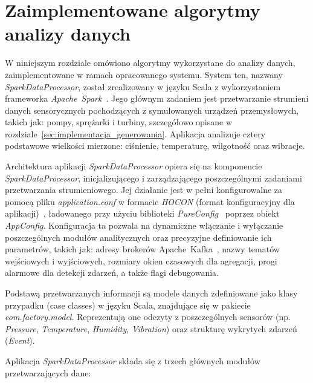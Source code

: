 \section{Zaimplementowane algorytmy analizy danych}
\label{sec:algorytmy_analizy}

W niniejszym rozdziale omówiono algorytmy wykorzystane do analizy danych, zaimplementowane w ramach opracowanego systemu. System ten, nazwany \textit{SparkDataProcessor}, został zrealizowany w języku Scala z wykorzystaniem frameworka \mbox{\textit{Apache Spark}}~\cite{spark_streaming}. Jego głównym zadaniem jest przetwarzanie strumieni danych sensorycznych pochodzących z symulowanych urządzeń przemysłowych, takich jak: pompy, sprężarki i turbiny, szczegółowo opisane w rozdziale~\ref{sec:implementacja_generowania}. Aplikacja analizuje cztery podstawowe wielkości mierzone: ciśnienie, temperaturę, wilgotność oraz wibracje.

Architektura aplikacji \textit{SparkDataProcessor} opiera się na komponencie \textit{SparkDataProcessor}, inicjalizującego i zarządzającego poszczególnymi zadaniami przetwarzania strumieniowego. Jej działanie jest w pełni konfigurowalne za pomocą pliku \textit{application.conf} w formacie \textit{HOCON} (format konfiguracyjny dla aplikacji)~\cite{hocon_spec}, ładowanego przy użyciu biblioteki \textit{PureConfig}~\cite{pureconfig_docs} poprzez obiekt \textit{AppConfig}. Konfiguracja ta pozwala na dynamiczne włączanie i wyłączanie poszczególnych modułów analitycznych oraz precyzyjne definiowanie ich parametrów, takich jak: adresy brokerów \mbox{Apache Kafka}~\cite{kafka}, nazwy tematów wejściowych i wyjściowych, rozmiary okien czasowych dla agregacji, progi alarmowe dla detekcji zdarzeń, a także flagi debugowania.

Podstawą przetwarzanych informacji są modele danych zdefiniowane jako klasy przypadku (case classes) w języku Scala, znajdujące się w pakiecie \textit{com.factory.model}. Reprezentują one odczyty z poszczególnych sensorów (np. \textit{Pressure}, \textit{Temperature}, \textit{Humidity}, \textit{Vibration}) oraz strukturę wykrytych zdarzeń (\textit{Event}).

Aplikacja \textit{SparkDataProcessor} składa się z trzech głównych modułów przetwarzających dane:


